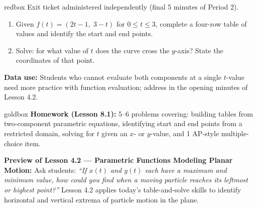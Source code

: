 \documentclass[10pt]{article}
\begin{document}
\vspace{0.08in}

\begin{skillbox}{redbox}
Exit ticket administered independently (final 5 minutes of Period 2).

\begin{enumerate}[leftmargin=1.4em, itemsep=4pt]
  \item Given $f(t) = (2t-1,\; 3-t)$ for $0 \le t \le 3$, complete a
    four-row table of values and identify the start and end points.
  \item Solve: for what value of $t$ does the curve cross the $y$-axis?
    State the coordinates of that point.
\end{enumerate}

\textbf{Data use:} Students who cannot evaluate both components at a
single $t$-value need more practice with function evaluation; address
in the opening minutes of Lesson 4.2.
\end{skillbox}

\vspace{0.08in}

\begin{skillbox}{goldbox}
\textbf{Homework (Lesson 8.1):} 5--6 problems covering: building tables
from two-component parametric equations, identifying start and end
points from a restricted domain, solving for $t$ given an $x$- or
$y$-value, and 1 AP-style multiple-choice item.

\textbf{Preview of Lesson 4.2 --- Parametric Functions Modeling Planar
Motion:} Ask students: \textit{``If $x(t)$ and $y(t)$ each have a
maximum and minimum value, how could you find when a moving particle
reaches its leftmost or highest point?''} Lesson 4.2 applies today's
table-and-solve skills to identify horizontal and vertical extrema of
particle motion in the plane.
\end{skillbox}
\end{document}
